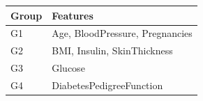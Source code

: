 \begin{tabular}{ll}
\toprule
Group & Features \\
\midrule
G1 & Age, BloodPressure, Pregnancies \\
G2 & BMI, Insulin, SkinThickness \\
G3 & Glucose \\
G4 & DiabetesPedigreeFunction \\
\bottomrule
\end{tabular}
